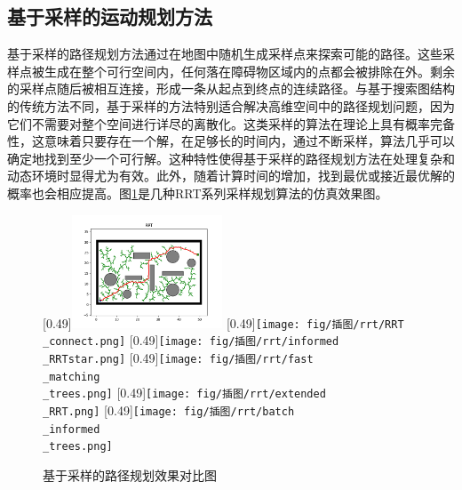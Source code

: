 \documentclass[master,academic]{ysuthesis} %
\begin{document}
		\subsection{基于采样的运动规划方法}
		基于采样的路径规划方法通过在地图中随机生成采样点来探索可能的路径。这些采样点被生成在整个可行空间内，任何落在障碍物区域内的点都会被排除在外。剩余的采样点随后被相互连接，形成一条从起点到终点的连续路径。与基于搜索图结构的传统方法不同，基于采样的方法特别适合解决高维空间中的路径规划问题，因为它们不需要对整个空间进行详尽的离散化。这类采样的算法在理论上具有概率完备性，这意味着只要存在一个解，在足够长的时间内，通过不断采样，算法几乎可以确定地找到至少一个可行解。这种特性使得基于采样的路径规划方法在处理复杂和动态环境时显得尤为有效。此外，随着计算时间的增加，找到最优或接近最优解的概率也会相应提高。图\ref{fig:基于采样的路径规划}是几种RRT系列采样规划算法的仿真效果图。
		\begin{figure}[H]
			\centering
			[0.49\textwidth]{\includegraphics[width=0.4\textwidth]{fig/插图/rrt/RRT.png}}
			[0.49\textwidth]{\texttt{[image: fig/插图/rrt/RRT\\\_connect.png]}}
			[0.49\textwidth]{\texttt{[image: fig/插图/rrt/informed\\\_RRTstar.png]}}
			[0.49\textwidth]{\texttt{[image: fig/插图/rrt/fast\\\_matching\\\_trees.png]}}
			[0.49\textwidth]{\texttt{[image: fig/插图/rrt/extended\\\_RRT.png]}}
			[0.49\textwidth]{\texttt{[image: fig/插图/rrt/batch\\\_informed\\\_trees.png]}}
			\caption{基于采样的路径规划效果对比图}
			\label{fig:基于采样的路径规划}
		\end{figure}
\end{document}
